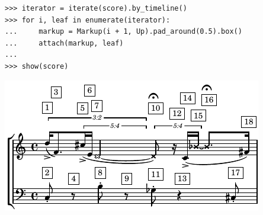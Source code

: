 \documentclass{article}
\begin{document}

\begin{lstlisting}
>>> iterator = iterate(score).by_timeline()
>>> for i, leaf in enumerate(iterator):
...     markup = Markup(i + 1, Up).pad_around(0.5).box()
...     attach(markup, leaf)
...
>>> show(score)
\end{lstlisting}
\includegraphics{assets/lilypond-a8c80733c1d89558f3f0c4e69eec6409.pdf}
\end{document}
